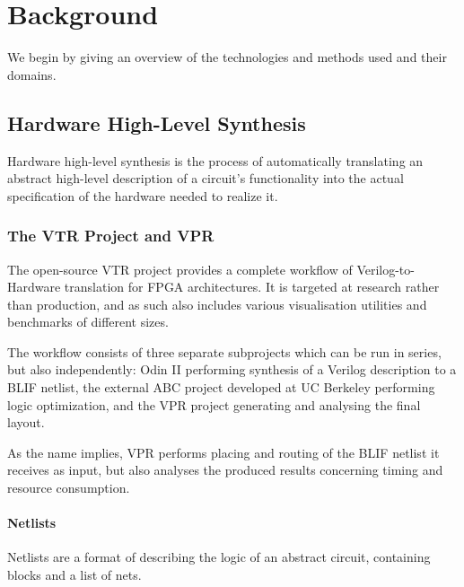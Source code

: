 
\chapter{Background}\label{ch:relatedwork}
\glsresetall %

We begin by giving an overview of the technologies and methods used and their domains.

\section{Hardware High-Level Synthesis}

Hardware high-level synthesis is the process of automatically translating an abstract high-level description of a circuit's functionality into the actual specification of the hardware needed to realize it.

\subsection{The VTR Project and VPR}

The open-source \gls{VTR} project\cite{vtr8} provides a complete workflow of Verilog-to-Hardware translation for \gls{FPGA} architectures. It is targeted at research rather than production, and as such also includes various visualisation utilities and benchmarks of different sizes.

The workflow consists of three separate subprojects which can be run in series, but also independently: Odin II performing synthesis of a Verilog description to a \gls{BLIF} netlist, the external ABC project developed at UC Berkeley\cite{ABC-web} performing logic optimization, and the \gls{VPR} project generating and analysing the final layout.

As the name implies, \gls{VPR} performs placing and routing of the \gls{BLIF} netlist it receives as input, but also analyses the produced results concerning timing and resource consumption.

\subsubsection{Netlists}

Netlists are a format of describing the logic of an abstract circuit, containing blocks and a list of nets.


